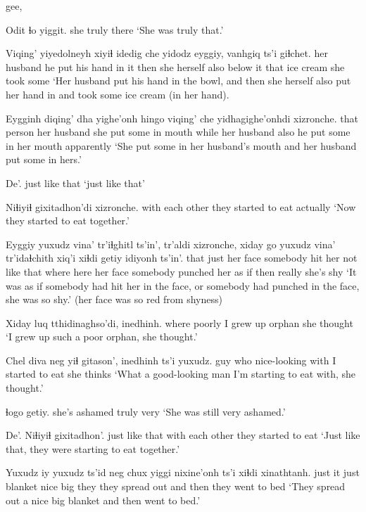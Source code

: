 \documentclass[12pt]{article}
\begin{document}
gee, 

\gll Odit ɬo yiggit.
she  truly there
\glt `She was truly that.'
\glend

\gll Viqing'     yiyedolneyh           xiyiɬ idedig  che  yidodz eyggiy, vanhgiq   ts'i giɬchet.
{her husband} {he put his hand in it} then  {she herself} also {below it} that  {ice cream} {} {she took some}
\glt `Her husband put his hand in the bowl, and then she herself also put her hand in and took some ice cream (in her hand).
\glend

\gll Eygginh diqing'     dha yighe'onh          hingo viqing'     che  yidhagighe'onhdi xizronche.
{that person} {her husband} {she put some in mouth} while {her husband} also {he put some in her mouth} apparently
\glt `She put some in her husband's mouth and her husband put some in hers.'
\glend

\gll De'.
{{just like that}}
\glt `just like that'
\glend

\gll Niɬiyiɬ         gixitadhon'di xizronche.
{with each other} {they started to eat} actually
\glt `Now they started to eat together.'
\glend

\gll Eyggiy yuxudz vina'     tr'iɬghitl ts'in',       tr'aldi xizronche, xiday go   yuxudz vina'    tr'idaɬchith         xiq'i xiɬdi getiy  idiyonh ts'in'.
that    just   {her face} {somebody hit her} {}     {not like that} {} where here  {}   {her face} {somebody punched her} {as if} then really {she's shy}
\glt `It was as if somebody had hit her in the face, or somebody had punched in the face, she was so shy.' (her face was so red from shyness)
\glend

\gll Xiday luq    tthidinaghso'di, inedhinh.
where poorly {I grew up orphan} {she thought}
\glt `I grew up such a poor orphan, she thought.'
\glend

\gll Chel diva neg          yiɬ  gitason',            inedhinh ts'i yuxudz.
guy  who nice-looking with {I started to eat} {she thinks }
\glt `What a good-looking man I'm starting to eat with, she thought.'
\glend

  ɬogo  getiy.
{she's ashamed} truly very
\glt `She was still very ashamed.'
\glend

\gll De'. Niɬiyiɬ         gixitadhon'.
{just like that} {with each other} {they started to eat}
\glt `Just like that, they were starting to eat together.'
\glend

\gll Yuxudz iy yuxudz ts'id   neg  chux yiggi nixine'onh   ts'i xiɬdi xinathtanh.
just   it just   blanket nice big  they {they spread out} and  then  {they went to bed}
\glt `They spread out a nice big blanket and then went to bed.'
\glend
\end{document}
